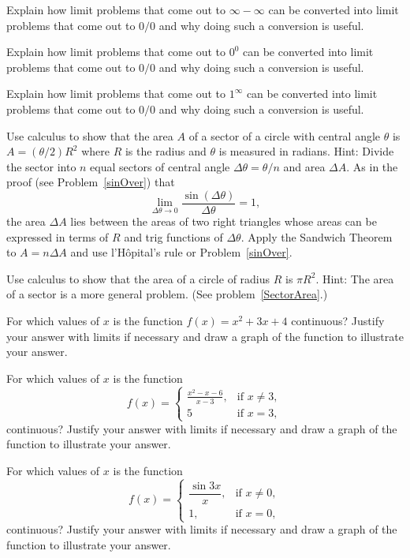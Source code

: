 \begin{multicols}{2}
  \problem Explain how limit problems that come out to $\infty-\infty$ can be
  converted into limit problems that come out to $0/0$ and why doing such a
  conversion is useful.


  \problem Explain how limit problems that come out to $0^0$ can be converted
  into limit problems that come out to $0/0$ and why doing such a conversion
  is useful.


  \problem Explain how limit problems that come out to $1^\infty$ can be
  converted into limit problems that come out to $0/0$ and why doing such a
  conversion is useful.


  \problem\label{SectorArea} Use calculus to show that the area $A$ of a
  sector of a circle with central angle $\theta$ is $A=(\theta/2)R^2$ where
  $R$ is the radius and $\theta$ is measured in radians.  Hint: Divide the
  sector into $n$ equal sectors of central angle $\Delta\theta=\theta/n$ and
  area $\Delta A$.  As in the proof (see Problem~\ref{sinOver}) that
  \[
  \lim_{\Delta\theta\to 0} \frac{\sin(\Delta\theta)}{\Delta\theta} = 1,
  \]
  the area $\Delta A$ lies between the areas of two right triangles whose
  areas can be expressed in terms of $R$ and trig functions of
  $\Delta\theta$.  Apply the Sandwich Theorem to $A=n\Delta A$ and use
  l'H\^opital's rule or Problem~\ref{sinOver}.


  \problem\label{CircleArea} Use calculus to show that the area of a circle
  of radius $R$ is $\pi R^2$.  Hint: The area of a sector is a more general
  problem.  (See problem~\ref{SectorArea}.)


  \problem For which values of $x$ is the function $f(x)=x^2+3x+4$
  continuous?  Justify your answer with limits if necessary and draw a graph
  of the function to illustrate your answer.


  \problem For which values of $x$ is the function
  \[
  f(x)=
  \begin{cases}
    \frac{x^2-x-6}{x-3}, & \text{if } x\ne 3, \\
    5 &\text{if }x=3,
  \end{cases}
  \]
  continuous?  Justify your answer with limits if necessary and draw a graph
  of the function to illustrate your answer.


  \problem For which values of $x$ is the function
  \[
  f(x)=
  \begin{cases}
    \dfrac{\sin 3x}{x}, & \text{if } x\ne 0, \\
    1, & \text{if } x=0,
  \end{cases}
  \]
  continuous?  Justify your answer with limits if necessary and draw a graph
  of the function to illustrate your answer.



\end{multicols}
